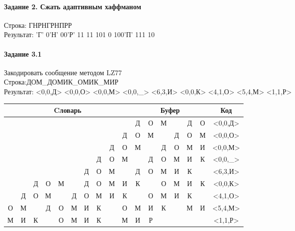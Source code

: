 \documentclass[a4paper, 12pt]{article}
\begin{document}
\pagebreak
\paragraph{Задание 2. Сжать адаптивным хаффманом\\}

Строка: 
ГНРНГРНПРР\\
Результат: 'Г' 0'Н' 00'Р' 11 11 101 0 100'П' 111 10










\pagebreak
\paragraph{Задание 3.1}

Закодировать сообщение методом LZ77\\
Строка:ДОМ\_ДОМИК\_ОМИК\_МИР\\
Результат: <0,0,Д> <0,0,О> <0,0,М> <0,0,\_> <6,3,И> <0,0,К> <4,1,О> <5,4,М> <1,1,Р>\\
\begin{table}[h!]
\centering
\begin{tabular}{|c|c|c|c|c|c|c|c|c|c|c|c|c|c|c|c|c|} 
\hline
\multicolumn{10}{|c|}{Cловарь} & \multicolumn{6}{c|}{Буфер} & Код  \\ \hline
  &   &   &   &   &   &   &   &   &   & \cellcolor[HTML]{8CE4F6} Д & О & М &   & Д & О & <0,0,Д>
\\ \hline
  &   &   &   &   &   &   &   &   & Д & \cellcolor[HTML]{8CE4F6} О & М &   & Д & О & М & <0,0,О>
\\ \hline
  &   &   &   &   &   &   &   & Д & О & \cellcolor[HTML]{8CE4F6} М &   & Д & О & М & И & <0,0,М>
\\ \hline
  &   &   &   &   &   &   & Д & О & М & \cellcolor[HTML]{8CE4F6}   & Д & О & М & И & К & <0,0,\_>
\\ \hline
  &   &   &   &   &   & \cellcolor[HTML]{FFFF00} Д & \cellcolor[HTML]{FFFF00} О & \cellcolor[HTML]{FFFF00} М &   & \cellcolor[HTML]{FFFF00} Д & \cellcolor[HTML]{FFFF00} О & \cellcolor[HTML]{FFFF00} М & \cellcolor[HTML]{8CE4F6} И & К &   & <6,3,И>
\\ \hline
  &   & Д & О & М &   & Д & О & М & И & \cellcolor[HTML]{8CE4F6} К &   & О & М & И & К & <0,0,К>
\\ \hline
  & Д & О & М & \cellcolor[HTML]{FFFF00}   & Д & О & М & И & К & \cellcolor[HTML]{FFFF00}   & \cellcolor[HTML]{8CE4F6} О & М & И & К &   & <4,1,О>
\\ \hline
О & М &   & Д & О & \cellcolor[HTML]{FFFF00} М & \cellcolor[HTML]{FFFF00} И & \cellcolor[HTML]{FFFF00} К & \cellcolor[HTML]{FFFF00}   & О & \cellcolor[HTML]{FFFF00} М & \cellcolor[HTML]{FFFF00} И & \cellcolor[HTML]{FFFF00} К & \cellcolor[HTML]{FFFF00}   & \cellcolor[HTML]{8CE4F6} М & И & <5,4,М>
\\ \hline
М & \cellcolor[HTML]{FFFF00} И & К &   & О & М & И & К &   & М & \cellcolor[HTML]{FFFF00} И & \cellcolor[HTML]{8CE4F6} Р &   &   &   &   & <1,1,Р>
\\ \hline
\end{tabular}
\end{table}
\end{document}
